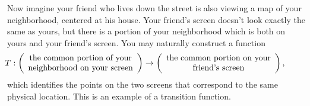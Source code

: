 



Now imagine your friend who lives down the street is also viewing a map of your neighborhood,
centered at his house. Your friend's screen doesn't look exactly the same as yours, but there
is a portion of your neighborhood which is both on yours and your friend's screen.
You may naturally construct a function
$$
\hspace{-1cm}
T:\left(
\begin{array}{c}
\text{the common portion of your}\\
\text{neighborhood on your screen}
\end{array}
\right) \to \left(
\begin{array}{c}
\text{the common portion on your}\\
\text{friend's screen}
\end{array}
\right),
$$
which identifies the points on the two screens that correspond to the same physical location.
This is an example of a transition function.


